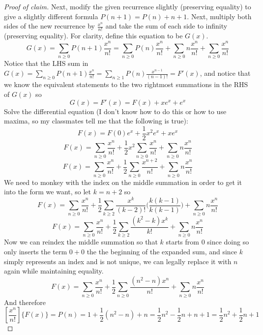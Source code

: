 \documentclass[12pt]{article}
\begin{document}
\begin{proof}[Proof of claim]
Next, modify the given recurrence slightly (preserving equality) to give a slightly different formula $P(n+1)=P(n)+n+1$. Next, multiply both sides of the new recurrence by $\frac{x^n}{n!}$ and take the sum of each side to infinity (preserving equality). For clarity, define this equation to be $G(x)$.
\[G(x)=\sum_{n \geq 0}P(n+1)\frac{x^n}{n!}=\sum_{n \geq 0}P(n)\frac{x^n}{n!}+\sum_{n \geq 0}n\frac{x^n}{n!}+\sum_{n \geq 0}\frac{x^n}{n!}\]
Notice that the LHS sum in $G(x)=\sum_{n \geq 0}P(n+1)\frac{x^n}{n!}=\sum_{n \geq 1}P(n)\frac{x^{n-1}}{(n-1)!}=F'(x)$, and notice that we know the equivalent statements to the two rightmost summations in the RHS of $G(x)$ so
\[G(x)=F'(x)=F(x)+xe^x+e^x\]
Solve the differential equation (I don't know how to do this or how to use maxima, so my classmates tell me that the following is true):
\[F(x)=F(0)e^x+\frac{1}{2}x^2e^x+xe^x\]
\[F(x)=\sum_{n\geq0}\frac{x^n}{n!}+\frac{1}{2}x^2\sum_{n \geq0}\frac{x^n}{n!}+\sum_{n\geq0}n\frac{x^n}{n!}\]
\[F(x)=\sum_{n\geq0}\frac{x^n}{n!}+\frac{1}{2}\sum_{n \geq0}\frac{x^{n+2}}{n!}+\sum_{n\geq0}n\frac{x^n}{n!}\]
We need to monkey with the index on the middle summation in order to get it into the form we want, so let $k=n+2$ so
\[F(x)=\sum_{n\geq0}\frac{x^n}{n!}+\frac{1}{2}\sum_{k \geq2}\frac{x^{k}}{(k-2)!}\bigg(\frac{k(k-1)}{k(k-1)}\bigg)+\sum_{n\geq0}n\frac{x^n}{n!}\]
\[F(x)=\sum_{n\geq0}\frac{x^n}{n!}+\frac{1}{2}\sum_{k \geq2}\frac{(k^2-k)x^{k}}{k!}+\sum_{n\geq0}n\frac{x^n}{n!}\]
Now we can reindex the middle summation so that $k$ starts from $0$ since doing so only inserts the term $0+0$ the the beginning of the expanded sum, and since $k$ simply represents an index and is not unique, we can legally replace it with $n$ again while maintaining equality.
\[F(x)=\sum_{n\geq0}\frac{x^n}{n!}+\frac{1}{2}\sum_{n \geq0}\frac{(n^2-n)x^{n}}{n!}+\sum_{n\geq0}n\frac{x^n}{n!}\]
And therefore
\[[\frac{x^n}{n!}]\{F(x)\}=P(n)=1+\frac{1}{2}(n^2-n)+n=\frac{1}{2}n^2-\frac{1}{2}n+n+1=\frac{1}{2}n^2+\frac{1}{2}n+1\]
\end{proof}
\end{document}
